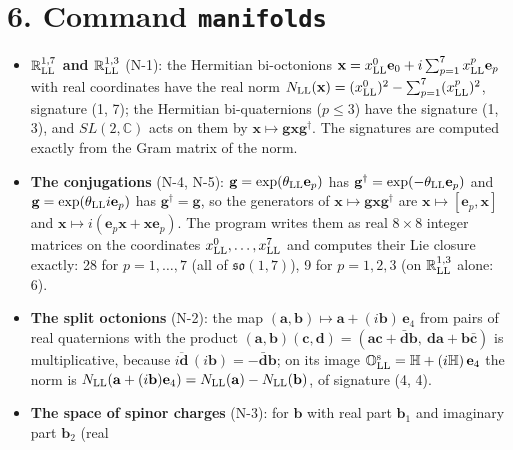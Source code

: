 \documentclass[
  10pt,
]{article}
\providecommand{\tightlist}{%
  \setlength{\itemsep}{0pt}\setlength{\parskip}{0pt}}
\begin{document}
\hypertarget{command-manifolds}{%
\section{\texorpdfstring{6. Command
\texttt{manifolds}}{6. Command manifolds}}\label{command-manifolds}}

\begin{itemize}
\tightlist
\item
  \textbf{\(\mathbb R^{1,7}_{\rm LL}\) and \(\mathbb R^{1,3}_{\rm LL}\)}
  (N-1): the Hermitian bi-octonions
  \(\mathbf x=x^0_{\rm LL}\mathbf e_0+i\sum_{p=1}^7x^p_{\rm LL}\mathbf e_p\)
  with real coordinates have the real norm
  \(N_{\rm LL}(\mathbf x)=(x^0_{\rm LL})^2-\sum_{p=1}^7(x^p_{\rm LL})^2\),
  signature (1, 7); the Hermitian bi-quaternions (\(p\le3\)) have the
  signature (1, 3), and \(SL(2,\mathbb C)\) acts on them by
  \(\mathbf x\mapsto\mathbf g\mathbf x\mathbf g^\dagger\). The
  signatures are computed exactly from the Gram matrix of the norm.
\item
  \textbf{The conjugations} (N-4, N-5):
  \(\mathbf g=\exp(\theta_{\rm LL}\mathbf e_p)\) has
  \(\mathbf g^\dagger=\exp(-\theta_{\rm LL}\mathbf e_p)\) and
  \(\mathbf g=\exp(\theta_{\rm LL}i\mathbf e_p)\) has
  \(\mathbf g^\dagger=\mathbf g\), so the generators of
  \(\mathbf x\mapsto\mathbf g\mathbf x\mathbf g^\dagger\) are
  \(\mathbf x\mapsto[\mathbf e_p,\mathbf x]\) and
  \(\mathbf x\mapsto i(\mathbf e_p\mathbf x+\mathbf x\mathbf e_p)\). The
  program writes them as real \(8\times8\) integer matrices on the
  coordinates \(x^0_{\rm LL},\dots,x^7_{\rm LL}\) and computes their Lie
  closure exactly: 28 for \(p=1,\dots,7\) (all of
  \(\mathfrak{so}(1,7)\)), 9 for \(p=1,2,3\) (on
  \(\mathbb R^{1,3}_{\rm LL}\) alone: 6).
\item
  \textbf{The split octonions} (N-2): the map
  \((\mathbf a,\mathbf b)\mapsto\mathbf a+(i\mathbf b)\,\mathbf e_4\)
  from pairs of real quaternions with the product
  \((\mathbf a,\mathbf b)(\mathbf c,\mathbf d)=(\mathbf a\mathbf c+\bar{\mathbf d}\mathbf b,\ \mathbf d\mathbf a+\mathbf b\bar{\mathbf c})\)
  is multiplicative, because
  \(\overline{i\mathbf d}\,(i\mathbf b)=-\bar{\mathbf d}\mathbf b\); on
  its image
  \(\mathbb O^{\rm s}_{\rm LL}=\mathbb H+(i\mathbb H)\,\mathbf e_4\) the
  norm is
  \(N_{\rm LL}(\mathbf a+(i\mathbf b)\mathbf e_4)=N_{\rm LL}(\mathbf a)-N_{\rm LL}(\mathbf b)\),
  of signature (4, 4).
\item
  \textbf{The space of spinor charges} (N-3): for \(\mathbf b\) with
  real part \(\mathbf b_1\) and imaginary part \(\mathbf b_2\) (real

\end{itemize}
\end{document}

